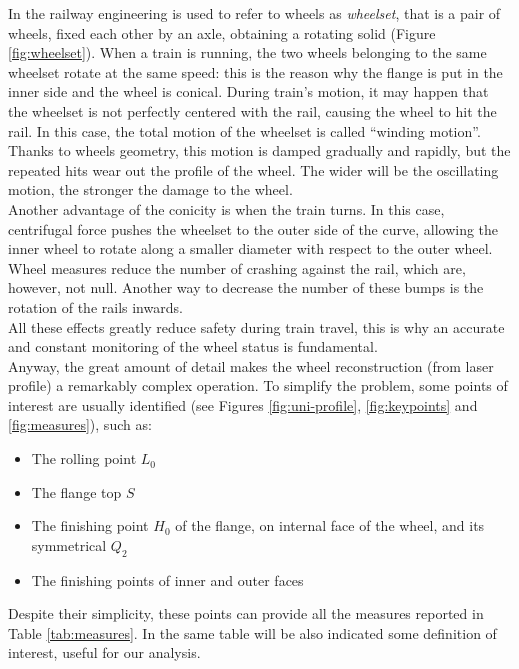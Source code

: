 In the railway engineering is used to refer to wheels as \textit{wheelset}, that is a pair of wheels, fixed each other by an axle, obtaining a rotating solid (Figure \ref{fig:wheelset}). When a train is running, the two wheels belonging to the same wheelset rotate at the same speed: this is the reason why the flange is put in the inner side and the wheel is conical. During train's motion, it may happen that the wheelset is not perfectly centered with the rail, causing the wheel to hit the rail. In this case, the total motion of the wheelset is called ``winding motion''. Thanks to wheels geometry, this motion is damped gradually and rapidly, but the repeated hits wear out the profile of the wheel. The wider will be the oscillating motion, the stronger the damage to the wheel. \\
Another advantage of the conicity is when the train turns. In this case, centrifugal force pushes the wheelset to the outer side of the curve, allowing the inner wheel to rotate along a smaller diameter with respect to the outer wheel. Wheel measures reduce the number of crashing against the rail, which are, however, not null. Another way to decrease the number of these bumps is the rotation of the rails inwards. \\
All these effects greatly reduce safety during train travel, this is why an accurate and constant monitoring of the wheel status is fundamental. \\

Anyway, the great amount of detail makes the wheel reconstruction (from laser profile) a remarkably complex operation. To simplify the problem, some points of interest are usually identified (see Figures \ref{fig:uni-profile}, \ref{fig:keypoints} and \ref{fig:measures}), such as:  
  \begin{itemize}
    \item The rolling point $L_0$
    \item The flange top $S$
    \item The finishing point $H_0$ of the flange, on internal face of the wheel, and its symmetrical $Q_2$
    \item The finishing points of inner and outer faces
  \end{itemize}
Despite their simplicity, these points can provide all the measures reported in Table \ref{tab:measures}. In the same table will be also indicated some definition of interest, useful for our analysis. \\

  ~\\
  
